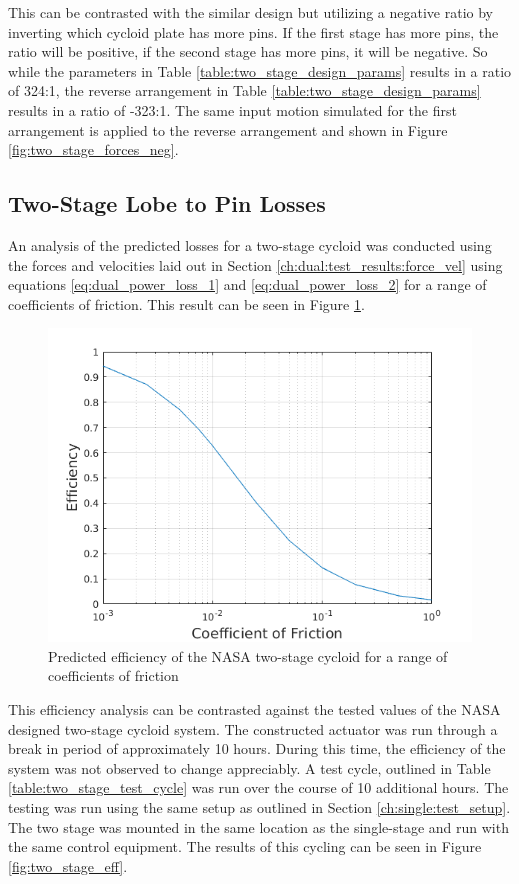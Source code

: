 This can be contrasted with the similar design but utilizing a negative ratio by inverting which cycloid plate has more pins. If the first stage has more pins, the ratio will be positive, if the second stage has more pins, it will be negative. So while the parameters in Table \ref{table:two_stage_design_params} results in a ratio of 324:1, the reverse arrangement in Table \ref{table:two_stage_design_params} results in a ratio of -323:1. The same input motion simulated for the first arrangement is applied to the reverse arrangement and shown in Figure \ref{fig:two_stage_forces_neg}.

\subsection{Two-Stage Lobe to Pin Losses} \label{ch:dual:test_results:losses}

An analysis of the predicted losses for a two-stage cycloid was conducted using the forces and velocities laid out in Section \ref{ch:dual:test_results:force_vel} using equations \ref{eq:dual_power_loss_1} and \ref{eq:dual_power_loss_2} for a range of coefficients of friction. This result can be seen in Figure \ref{fig:two_stage_as_designed}.

\begin{figure}[t]
	\centering
	\includegraphics[width=0.75\linewidth]{fig/two_stage_as_designed}
   \caption{Predicted efficiency of the NASA two-stage cycloid for a range of coefficients of friction}
   \label{fig:two_stage_as_designed}
\end{figure}

This efficiency analysis can be contrasted against the tested values of the NASA designed two-stage cycloid system. The constructed actuator was run through a break in period of approximately 10 hours. During this time, the efficiency of the system was not observed to change appreciably. A test cycle, outlined in Table \ref{table:two_stage_test_cycle} was run over the course of 10 additional hours. The testing was run using the same setup as outlined in Section \ref{ch:single:test_setup}. The two stage was mounted in the same location as the single-stage and run with the same control equipment. The results of this cycling can be seen in Figure \ref{fig:two_stage_eff}.

